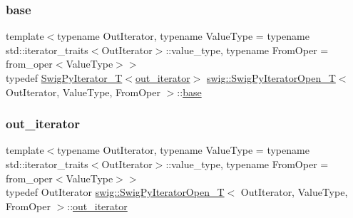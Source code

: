 \subsubsection{\texorpdfstring{base}{base}}
{\footnotesize\ttfamily template$<$typename Out\+Iterator, typename Value\+Type = typename std\+::iterator\+\_\+traits$<$\+Out\+Iterator$>$\+::value\+\_\+type, typename From\+Oper = from\+\_\+oper$<$\+Value\+Type$>$$>$ \\
typedef \hyperlink{classswig_1_1_swig_py_iterator___t}{Swig\+Py\+Iterator\+\_\+T}$<$\hyperlink{classswig_1_1_swig_py_iterator___t_aec35545038c3d804975a147253f061e4}{out\+\_\+iterator}$>$ \hyperlink{classswig_1_1_swig_py_iterator_open___t}{swig\+::\+Swig\+Py\+Iterator\+Open\+\_\+T}$<$ Out\+Iterator, Value\+Type, From\+Oper $>$\+::\hyperlink{classswig_1_1_swig_py_iterator_open___t_acee28cc32d3d9a19f711bd9df933b06c}{base}}

\mbox{\label{classswig_1_1_swig_py_iterator_open___t_ad348022c40678f2217e0696c8b6bb59b}} 
\subsubsection{\texorpdfstring{out\+\_\+iterator}{out\_iterator}}
{\footnotesize\ttfamily template$<$typename Out\+Iterator, typename Value\+Type = typename std\+::iterator\+\_\+traits$<$\+Out\+Iterator$>$\+::value\+\_\+type, typename From\+Oper = from\+\_\+oper$<$\+Value\+Type$>$$>$ \\
typedef Out\+Iterator \hyperlink{classswig_1_1_swig_py_iterator_open___t}{swig\+::\+Swig\+Py\+Iterator\+Open\+\_\+T}$<$ Out\+Iterator, Value\+Type, From\+Oper $>$\+::\hyperlink{classswig_1_1_swig_py_iterator___t_aec35545038c3d804975a147253f061e4}{out\+\_\+iterator}}

\mbox{\label{classswig_1_1_swig_py_iterator_open___t_a232561380f04d1a22f772e24d6ff38e5}} 
